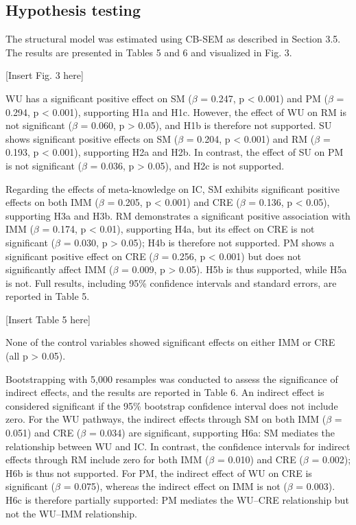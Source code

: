 \documentclass[authoryear,preprint,review,times,10pt]{elsarticle}
\begin{document}
\subsection{Hypothesis testing}
The structural model was estimated using CB-SEM as described in Section 3.5. The results are presented in Tables 5 and 6 and visualized in Fig. 3.

\begin{center}[Insert Fig. 3 here]\end{center}

WU has a significant positive effect on SM ($\beta$ = 0.247, p < 0.001) and PM ($\beta$ = 0.294, p < 0.001), supporting H1a and H1c. However, the effect of WU on RM is not significant ($\beta$ = 0.060, p > 0.05), and H1b is therefore not supported. SU shows significant positive effects on SM ($\beta$ = 0.204, p < 0.001) and RM ($\beta$ = 0.193, p < 0.001), supporting H2a and H2b. In contrast, the effect of SU on PM is not significant ($\beta$ = 0.036, p > 0.05), and H2c is not supported.

Regarding the effects of meta-knowledge on IC, SM exhibits significant positive effects on both IMM ($\beta$ = 0.205, p < 0.001) and CRE ($\beta$ = 0.136, p < 0.05), supporting H3a and H3b. RM demonstrates a significant positive association with IMM ($\beta$ = 0.174, p < 0.01), supporting H4a, but its effect on CRE is not significant ($\beta$ = 0.030, p > 0.05); H4b is therefore not supported. PM shows a significant positive effect on CRE ($\beta$ = 0.256, p < 0.001) but does not significantly affect IMM ($\beta$ = 0.009, p > 0.05). H5b is thus supported, while H5a is not. Full results, including 95\% confidence intervals and standard errors, are reported in Table 5.

\begin{center}[Insert Table 5 here]\end{center}

None of the control variables showed significant effects on either IMM or CRE (all p > 0.05).

Bootstrapping with 5,000 resamples was conducted to assess the significance of indirect effects, and the results are reported in Table 6. An indirect effect is considered significant if the 95\% bootstrap confidence interval does not include zero. For the WU pathways, the indirect effects through SM on both IMM ($\beta$ = 0.051) and CRE ($\beta$ = 0.034) are significant, supporting H6a: SM mediates the relationship between WU and IC. In contrast, the confidence intervals for indirect effects through RM include zero for both IMM ($\beta$ = 0.010) and CRE ($\beta$ = 0.002); H6b is thus not supported. For PM, the indirect effect of WU on CRE is significant ($\beta$ = 0.075), whereas the indirect effect on IMM is not ($\beta$ = 0.003). H6c is therefore partially supported: PM mediates the WU--CRE relationship but not the WU--IMM relationship.
\end{document}
